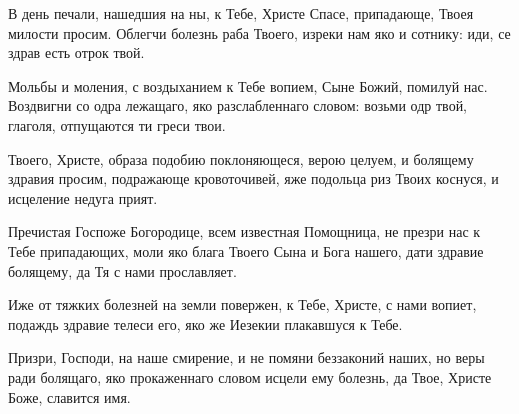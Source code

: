 

\label{_content_obolyachih}

 

\begin{mymulticols}
 






В день печали, нашедшия на ны, к Тебе, Христе Спасе, припадающе, Твоея милости просим. Облегчи болезнь раба Твоего, изреки нам яко и сотнику: иди, се здрав есть отрок твой.


Мольбы и моления, с воздыханием к Тебе вопием, Сыне Божий, помилуй нас. Воздвигни со одра лежащаго, яко разслабленнаго словом: возьми одр твой, глаголя, отпущаются ти греси твои.

\slava

Твоего, Христе, образа подобию поклоняющеся, верою целуем, и болящему здравия просим, подражающе кровоточивей, яже подольца риз Твоих коснуся, и исцеление недуга прият.

\inyne

Пречистая Госпоже Богородице, всем известная Помощница, не презри нас к Тебе припадающих, моли яко блага Твоего Сына и Бога нашего, дати здравие болящему, да Тя с нами прославляет.






Иже от тяжких болезней на земли повержен, к Тебе, Христе, с нами вопиет, подаждь здравие телеси его, яко же Иезекии плакавшуся к Тебе.


Призри, Господи, на наше смирение, и не помяни беззаконий наших, но веры ради болящаго, яко прокаженнаго словом исцели ему болезнь, да Твое, Христе Боже, славится имя.


\end{mymulticols}
